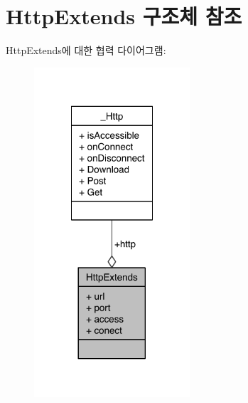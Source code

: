 \hypertarget{struct_http_extends}{\section{Http\-Extends 구조체 참조}
\label{struct_http_extends}
}


Http\-Extends에 대한 협력 다이어그램\-:\nopagebreak
\begin{figure}[H]
\begin{center}
\leavevmode
\includegraphics[width=164pt]{d3/d1a/struct_http_extends__coll__graph}
\end{center}
\end{figure}
